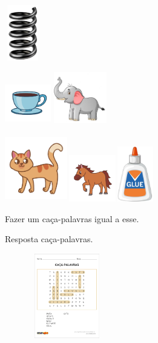 \includegraphics[width=0.61042in,height=0.95923in]{media/image31.png}

\includegraphics[width=0.78750in,height=0.70972in]{media/image32.png}\includegraphics[width=1.02361in,height=0.88333in]{media/image33.png}

\includegraphics[width=1.07569in,height=1.14514in]{media/image34.png}\includegraphics[width=0.85069in,height=0.80069in]{media/image35.png}\includegraphics[width=0.63333in,height=0.94653in]{media/image36.png}

Fazer um caça-palavras igual a esse.

Resposta caça-palavras.

\includegraphics[width=2.13750in,height=1.44792in]{media/image37.jpg}

